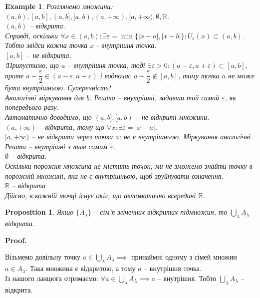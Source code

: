 \documentclass[a4paper, 14pt]{article}
\makeatletter
\def\qed{$\blacksquare$}
\theoremstyle{theoremdd}
\theoremstyle{theoremdd}
\theoremstyle{theoremdd}
\theoremstyle{theoremdd}
\newtheorem{example}[theorem]{Example}
\theoremstyle{theoremdd}
\newtheorem{proposition}[theorem]{Proposition}
\theoremstyle{theoremdd}
\theoremstyle{theoremdd}
\theoremstyle{theoremdd}
\renewenvironment{proof}[1][Proof.\\]{\par
\pushQED{\hfill \qed}%
\normalfont \topsep6\p@\@plus6\p@\relax
\trivlist
\item\relax
{\bfseries
#1\@addpunct{.}}\hspace\labelsep\ignorespaces
}{%
\popQED\endtrivlist\@endpefalse
}
\makeatother
\begin{document}
\begin{example}
Розглянемо множини: $(a,b), [a,b], (a,b], [a,b), (a,+\infty), [a,+\infty), \emptyset, \mathbb{R}$.\\
$(a,b)$ -- відкрита.\\
Справді, оскільки $\forall x \in (a,b): \exists \varepsilon = \min\{|x-a|,|x-b|\}:  U_{\varepsilon}(x) \subset (a,b)$. Тобто звідси кожна точка $x$ - внутрішня точка.
\bigskip \\
$[a,b]$ -- не відкрита.\\
!Припустимо, що $a$ -- внутрішня точка, тоді $\exists \varepsilon > 0: (a-\varepsilon, a+\varepsilon) \subset [a,b]$, проте $a-\dfrac{\varepsilon}{2} \in (a - \varepsilon, a + \varepsilon)$ і водночас $a-\dfrac{\varepsilon}{2} \not \in [a,b]$, тому точка $a$ не може бути внутрішньою. Суперечність! \\
Аналогічні міркування для $b$. Решта -- внутрішні, задавши той самий $\varepsilon$, як попередього разу.
\bigskip \\
Автоматично доводимо, що $(a,b],[a,b)$ -- не відкриті множини.
\bigskip \\
$(a,+\infty)$ -- відкрита, тому що $\forall x: \exists \varepsilon = |x-a|$.
\bigskip \\
$[a,+\infty)$ -- не відкрита через точка $a$: не є внутрішньою. Міркування аналогічні. Решта -- внутрішні з тим самим $\varepsilon$.
\bigskip \\
$\emptyset$ -- відкрита. \\
Оскільки порожня множина не містить точок, ми не зможемо знайти точку в порожній множині, яка не є внутрішньою, щоб зруйнувати означення.
\bigskip \\
$\mathbb{R}$ -- відкрита\\
Дійсно, в кожній точці існує окіл, що автоматично всередині $\mathbb{R}$.
\end{example}

\begin{proposition}
Якщо $\{A_{\lambda}\}$ -- сім'я зліченних відкритих підмножин, то $\displaystyle \bigcup_{\lambda} A_{\lambda}$ -- відкрита.
\end{proposition}

\begin{proof}
Візьмемо довільну точку $a \in \displaystyle \bigcup_{\lambda} A_{\lambda} \implies$ принаймні одному з сімей множин $a \in A_{\lambda}$. Така множина є відкритою, а тому $a$ -- внутрішня точка.\\
Із нашого ланцюга отримаємо: $\forall a \in \displaystyle \bigcup_{\lambda} A_{\lambda} \implies a$ -- внутрішня. Тобто $\displaystyle \bigcup_{\lambda} A_{\lambda}$ -- відкрита.
\end{proof}
\end{document}
